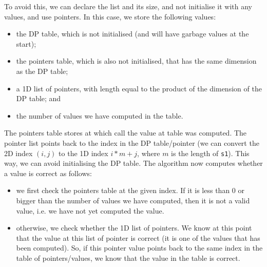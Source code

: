 \documentclass[a4paper, openany]{memoir}
\begin{document}
    To avoid this, we can declare the list and its size, and not initialise it with any values, and use pointers. In this case, we store the following values:
    \begin{itemize}
        \item the DP table, which is not initialised (and will have garbage values at the start);
        \item the pointers table, which is also not initialised, that has the same dimension as the DP table;
        \item a 1D list of pointers, with length equal to the product of the dimension of the DP table; and
        \item the number of values we have computed in the table.
    \end{itemize}
    The pointers table stores at which call the value at table was computed. The pointer list points back to the index in the DP table/pointer (we can convert the 2D index $(i, j)$ to the 1D index $i * m + j$, where $m$ is the length of \texttt{s1}). This way, we can avoid initialising the DP table. The algorithm now computes whether a value is correct as follows:
    \begin{itemize}
        \item we first check the pointers table at the given index. If it is less than 0 or bigger than the number of values we have computed, then it is not a valid value, i.e. we have not yet computed the value.
        \item otherwise, we check whether the 1D list of pointers. We know at this point that the value at this list of pointer is correct (it is one of the values that has been computed). So, if this pointer value points back to the same index in the table of pointers/values, we know that the value in the table is correct.
    \end{itemize}
\end{document}
